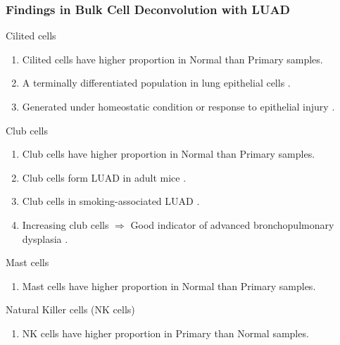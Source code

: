 \documentclass{beamer}
\begin{document}
    \begin{frame}[allowframebreaks]
        \frametitle{Findings in Bulk Cell Deconvolution with LUAD}

        \begin{block}{Cilited cells}
            \begin{enumerate}
                \item Cilited cells have higher proportion in Normal than Primary samples.
                \item A terminally differentiated population in lung epithelial cells \cite{ciliated-1}.
                \item Generated under homeostatic condition or response to epithelial injury \cite{ciliated-2}.
            \end{enumerate}
        \end{block}

        \begin{block}{Club cells}
            \begin{enumerate}
                \item Club cells have higher proportion in Normal than Primary samples.
                \item Club cells form LUAD in adult mice \cite{club-1}.
                \item Club cells in smoking-associated LUAD \cite{club-2}.
                \item Increasing club cells $\Rightarrow$ Good indicator of advanced bronchopulmonary dysplasia \cite{club-3}.
            \end{enumerate}
        \end{block}

        \begin{block}{Mast cells}
            \begin{enumerate}
                \item Mast cells have higher proportion in Normal than Primary samples.
            \end{enumerate}
        \end{block}

        \begin{block}{Natural Killer cells (NK cells)}
            \begin{enumerate}
                \item NK cells have higher proportion in Primary than Normal samples.
            \end{enumerate}
        \end{block}


\end{frame}
\end{document}
